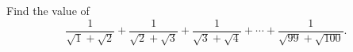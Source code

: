 Find the value of
\[\dfrac{1}{\sqrt1+\sqrt2}+\dfrac{1}{\sqrt2+\sqrt3}+\dfrac{1}{\sqrt3+\sqrt4}+\cdots+\dfrac{1}{\sqrt{99}+\sqrt{100}}.\]
